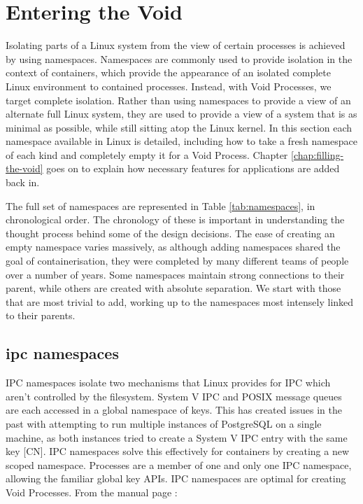 \documentclass[a4paper,12pt,twoside,openright]{report}
\begin{document}
\chapter{Entering the Void}
\label{chap:entering-the-void}

Isolating parts of a Linux system from the view of certain processes is achieved by using namespaces. Namespaces are commonly used to provide isolation in the context of containers, which provide the appearance of an isolated complete Linux environment to contained processes. Instead, with Void Processes, we target complete isolation. Rather than using namespaces to provide a view of an alternate full Linux system, they are used to provide a view of a system that is as minimal as possible, while still sitting atop the Linux kernel. In this section each namespace available in Linux is detailed, including how to take a fresh namespace of each kind and completely empty it for a Void Process. Chapter \ref{chap:filling-the-void} goes on to explain how necessary features for applications are added back in.

The full set of namespaces are represented in Table \ref{tab:namespaces}, in chronological order. The chronology of these is important in understanding the thought process behind some of the design decisions. The ease of creating an empty namespace varies massively, as although adding namespaces shared the goal of containerisation, they were completed by many different teams of people over a number of years. Some namespaces maintain strong connections to their parent, while others are created with absolute separation. We start with those that are most trivial to add, working up to the namespaces most intensely linked to their parents.

\section{ipc namespaces}
\label{sec:voiding-ipc}

IPC namespaces isolate two mechanisms that Linux provides for IPC which aren't controlled by the filesystem. System V IPC and POSIX message queues are each accessed in a global namespace of keys. This has created issues in the past with attempting to run multiple instances of PostgreSQL on a single machine, as both instances tried to create a System V IPC entry with the same key [CN]. IPC namespaces solve this effectively for containers by creating a new scoped namespace. Processes are a member of one and only one IPC namespace, allowing the familiar global key APIs. IPC namespaces are optimal for creating Void Processes. From the manual page \citep{free_software_foundation_ipc_namespaces7_2021}:
\end{document}
